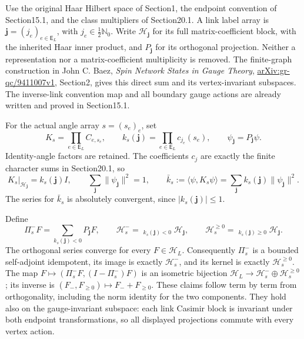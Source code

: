 \documentclass[
]{article}
\begin{document}
Use the original Haar Hilbert space of Section1, the endpoint convention
of Section15.1, and the class multipliers of Section20.1. A link label
array is \(\boldsymbol j=(j_e)_{e\in\mathsf E_L}\), with
\(j_e\in\frac12\mathbb N_0\). Write \(\mathscr H_{\boldsymbol j}\) for
its full matrix-coefficient block, with the inherited Haar inner
product, and \(P_{\boldsymbol j}\) for its orthogonal projection.
Neither a representation nor a matrix-coefficient multiplicity is
removed. The finite-graph construction in John C. Baez, \emph{Spin
Network States in Gauge Theory},
\href{https://arxiv.org/abs/gr-qc/9411007v1}{arXiv:gr-qc/9411007v1},
Section2, gives this direct sum and its vertex-invariant subspaces. The
inverse-link convention map and all boundary gauge actions are already
written and proved in Section15.1.

For the actual angle array \(s=(s_e)_e\), set \[
K_s=\prod_{e\in\mathsf E_L}C_{e,s_e},\qquad
k_s(\boldsymbol j)=\prod_{e\in\mathsf E_L}c_{j_e}(s_e),\qquad
\psi_{\boldsymbol j}=P_{\boldsymbol j}\psi .
\] Identity-angle factors are retained. The coefficients \(c_j\) are
exactly the finite character sums in Section20.1, so \[
K_s|_{\mathscr H_{\boldsymbol j}}
 =k_s(\boldsymbol j)I,\qquad
\sum_{\boldsymbol j}\|\psi_{\boldsymbol j}\|^2=1,\qquad
\bar k_s:=\langle\psi,K_s\psi\rangle
 =\sum_{\boldsymbol j}k_s(\boldsymbol j)\|\psi_{\boldsymbol j}\|^2 .
                                                               \tag{21.1}
\] The series for \(\bar k_s\) is absolutely convergent, since
\(|k_s(\boldsymbol j)|\le1\).

Define \[
\Pi_s^-F=\sum_{k_s(\boldsymbol j)<0}P_{\boldsymbol j}F,\qquad
\mathscr H_s^-=\mathop{\widehat\bigoplus}_{k_s(\boldsymbol j)<0}
                    \mathscr H_{\boldsymbol j},\qquad
\mathscr H_s^{\ge0}=\mathop{\widehat\bigoplus}_{k_s(\boldsymbol j)\ge0}
                    \mathscr H_{\boldsymbol j}.
                                                               \tag{21.2}
\] The orthogonal series converge for every \(F\in\mathcal H_L\).
Consequently \(\Pi_s^-\) is a bounded self-adjoint idempotent, its image
is exactly \(\mathscr H_s^-\), and its kernel is exactly
\(\mathscr H_s^{\ge0}\). The map \(F\mapsto(\Pi_s^-F,(I-\Pi_s^-)F)\) is
an isometric bijection
\(\mathcal H_L\to\mathscr H_s^-\oplus\mathscr H_s^{\ge0}\); its inverse
is \((F_-,F_{\ge0})\mapsto F_-+F_{\ge0}\). These claims follow term by
term from orthogonality, including the norm identity for the two
components. They hold also on the gauge-invariant subspace: each link
Casimir block is invariant under both endpoint transformations, so all
displayed projections commute with every vertex action.
\end{document}
